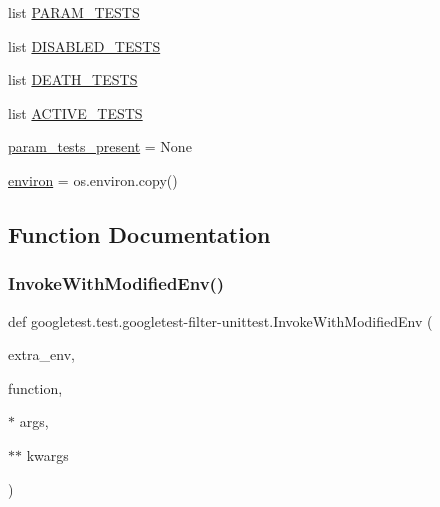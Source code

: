 \begin{DoxyCompactItemize}
\item 
list \mbox{\hyperlink{namespacegoogletest_1_1test_1_1googletest-filter-unittest_a69696cd740070a1eb3f9c507861448bd}{P\+A\+R\+A\+M\+\_\+\+T\+E\+S\+TS}}
\item 
list \mbox{\hyperlink{namespacegoogletest_1_1test_1_1googletest-filter-unittest_a98fa75f51b20bb5b8d680e6f1de569fe}{D\+I\+S\+A\+B\+L\+E\+D\+\_\+\+T\+E\+S\+TS}}
\item 
list \mbox{\hyperlink{namespacegoogletest_1_1test_1_1googletest-filter-unittest_af28382c63f6e7c975abe64512bad9209}{D\+E\+A\+T\+H\+\_\+\+T\+E\+S\+TS}}
\item 
list \mbox{\hyperlink{namespacegoogletest_1_1test_1_1googletest-filter-unittest_a8e4bb4e5c92ca7a573dfb28c2e9024a9}{A\+C\+T\+I\+V\+E\+\_\+\+T\+E\+S\+TS}}
\item 
\mbox{\hyperlink{namespacegoogletest_1_1test_1_1googletest-filter-unittest_a78886b9c6292f80e51fdc319bd616300}{param\+\_\+tests\+\_\+present}} = None
\item 
\mbox{\hyperlink{namespacegoogletest_1_1test_1_1googletest-filter-unittest_a8cacf6781d2473fb19b4d59fd60bba56}{environ}} = os.\+environ.\+copy()
\end{DoxyCompactItemize}


\subsection{Function Documentation}
\mbox{\label{namespacegoogletest_1_1test_1_1googletest-filter-unittest_af029a8050c10c4ec9391cfca6c64c6c3}} 
\subsubsection{\texorpdfstring{InvokeWithModifiedEnv()}{InvokeWithModifiedEnv()}}
{\footnotesize\ttfamily def googletest.\+test.\+googletest-\/filter-\/unittest.\+Invoke\+With\+Modified\+Env (\begin{DoxyParamCaption}\item[{}]{extra\+\_\+env,  }\item[{}]{function,  }\item[{$\ast$}]{args,  }\item[{$\ast$$\ast$}]{kwargs }\end{DoxyParamCaption})}

